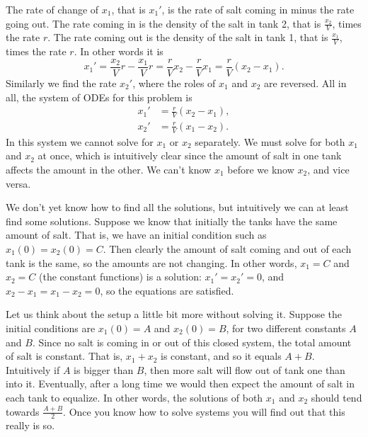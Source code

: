 \documentclass{ximera}
\begin{document}
\begin{exampleSol}
    The rate of change of $x_1$, that is $x_1'$, is the rate of salt coming in minus the rate going out. The rate coming in is the density of the salt in tank 2, that is $\frac{x_2}{V}$, times the rate $r$. The rate coming out is the density of the salt in tank 1, that is $\frac{x_1}{V}$, times the rate $r$. In other words it is 
    \begin{equation*}
        x_1' = \frac{x_2}{V} r - \frac{x_1}{V} r = \frac{r}{V} x_2 - \frac{r}{V} x_1  = \frac{r}{V} (x_2-x_1).
    \end{equation*}
    Similarly we find the rate $x_2'$, where the roles of $x_1$ and $x_2$ are reversed.  All in all, the system of ODEs for this problem is
    \begin{align*}
        x_1' & = \frac{r}{V} (x_2-x_1), \\
        x_2' & = \frac{r}{V} (x_1-x_2).
    \end{align*}
    In this system we cannot solve for $x_1$ or $x_2$ separately.  We must solve for both $x_1$ and $x_2$ at once, which is intuitively clear since the amount of salt in one tank affects the amount in the other. We can't know $x_1$ before we know $x_2$, and vice versa. 
    
    We don't yet know how to find all the solutions, but intuitively we can at least find some solutions.  Suppose we know that initially the tanks have the same amount of salt.  That is, we have an initial condition such as $x_1(0)=x_2(0) = C$.  Then clearly the amount of salt coming and out of each tank is the same, so the amounts are not changing.  In other words, $x_1 = C$ and $x_2 = C$ (the constant functions) is a solution:  $x_1' = x_2' = 0$, and $x_2-x_1 = x_1-x_2 = 0$, so the equations are satisfied. 
    
    Let us think about the setup a little bit more without solving it.  Suppose the initial conditions are $x_1(0) = A$ and $x_2(0) = B$, for two different constants $A$ and $B$.  Since no salt is coming in or out of this closed system, the total amount of salt is constant.  That is, $x_1+x_2$ is constant, and so it equals $A+B$. Intuitively if $A$ is bigger than $B$, then more salt will flow out of tank one than into it.  Eventually, after a long time we would then expect the amount of salt in each tank to equalize. In other words, the solutions of both $x_1$ and $x_2$ should tend towards $\frac{A+B}{2}$.  Once you know how to solve systems you will find out that this really is so.
\end{exampleSol}
\end{document}
